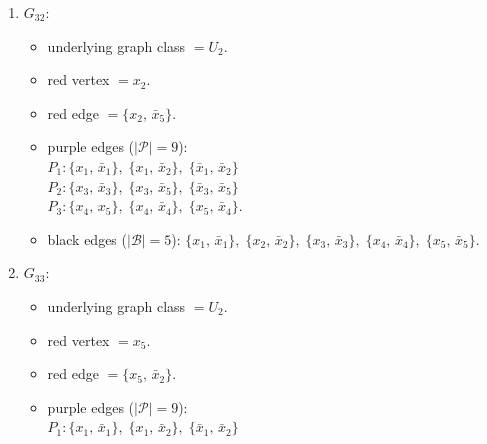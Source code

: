 \begin{enumerate}[leftmargin=*]
\begin{itemize}[leftmargin=*]
\item red vertex $= \bar{x}_{4}$.
\item red edge $= \{\bar{x}_{2},\,\bar{x}_{4}\}$.
\item purple edges ($|\mathcal{P}|=9$):\mbox{}\\
$P_{1}: \{x_{1},\,\bar{x}_{1}\},\; \{x_{1},\,\bar{x}_{2}\},\; \{\bar{x}_{1},\,\bar{x}_{2}\}$\\
$P_{2}: \{x_{2},\,x_{4}\},\; \{x_{2},\,x_{5}\},\; \{x_{4},\,x_{5}\}$\\
$P_{3}: \{x_{3},\,\bar{x}_{3}\},\; \{x_{3},\,\bar{x}_{5}\},\; \{\bar{x}_{3},\,\bar{x}_{5}\}$.
\item black edges ($|\mathcal{B}|=5$): $\{x_{1},\,\bar{x}_{1}\},\; \{x_{2},\,\bar{x}_{2}\},\; \{x_{3},\,\bar{x}_{3}\},\; \{x_{4},\,\bar{x}_{4}\},\; \{x_{5},\,\bar{x}_{5}\}$.
\end{itemize}
\item $G_{32}$:
\begin{itemize}[leftmargin=*]
\item underlying graph class $= U_2$.
\item red vertex $= x_{2}$.
\item red edge $= \{x_{2},\,\bar{x}_{5}\}$.
\item purple edges ($|\mathcal{P}|=9$):\mbox{}\\
$P_{1}: \{x_{1},\,\bar{x}_{1}\},\; \{x_{1},\,\bar{x}_{2}\},\; \{\bar{x}_{1},\,\bar{x}_{2}\}$\\
$P_{2}: \{x_{3},\,\bar{x}_{3}\},\; \{x_{3},\,\bar{x}_{5}\},\; \{\bar{x}_{3},\,\bar{x}_{5}\}$\\
$P_{3}: \{x_{4},\,x_{5}\},\; \{x_{4},\,\bar{x}_{4}\},\; \{x_{5},\,\bar{x}_{4}\}$.
\item black edges ($|\mathcal{B}|=5$): $\{x_{1},\,\bar{x}_{1}\},\; \{x_{2},\,\bar{x}_{2}\},\; \{x_{3},\,\bar{x}_{3}\},\; \{x_{4},\,\bar{x}_{4}\},\; \{x_{5},\,\bar{x}_{5}\}$.
\end{itemize}
\item $G_{33}$:
\begin{itemize}[leftmargin=*]
\item underlying graph class $= U_2$.
\item red vertex $= x_{5}$.
\item red edge $= \{x_{5},\,\bar{x}_{2}\}$.
\item purple edges ($|\mathcal{P}|=9$):\mbox{}\\
$P_{1}: \{x_{1},\,\bar{x}_{1}\},\; \{x_{1},\,\bar{x}_{2}\},\; \{\bar{x}_{1},\,\bar{x}_{2}\}$\\

\end{itemize}
\end{enumerate}
